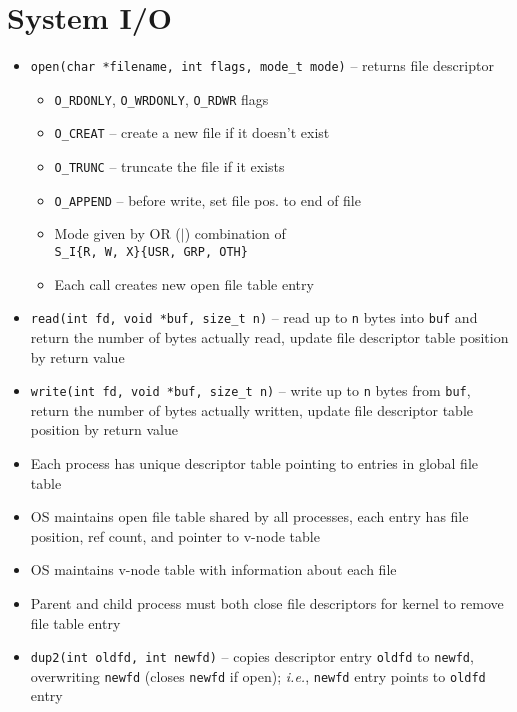 \documentclass[twocolumn]{article}
\begin{document}
\section{System I/O}
\begin{itemize}[noitemsep]
    \item \texttt{open(char *filename, int flags, mode\_t mode)} -- returns file descriptor
    \begin{itemize}[noitemsep]
        \item \texttt{O\_RDONLY}, \texttt{O\_WRDONLY}, \texttt{O\_RDWR} flags
        \item \texttt{O\_CREAT} -- create a new file if it doesn't exist
        \item \texttt{O\_TRUNC} -- truncate the file if it exists
        \item \texttt{O\_APPEND} -- before write, set file pos. to end of file
        \item Mode given by OR ($|$) combination of \\ \texttt{S\_I\{R, W, X\}\{USR, GRP, OTH\}}
        \item Each call creates new open file table entry
    \end{itemize}
    \item \texttt{read(int fd, void *buf, size\_t n)} -- read up to \texttt{n} bytes into \texttt{buf} and return the number of bytes actually read, update file descriptor table position by return value
    \item \texttt{write(int fd, void *buf, size\_t n)} -- write up to \texttt{n} bytes from \texttt{buf}, return the number of bytes actually written, update file descriptor table position by return value
    \item Each process has unique descriptor table pointing to entries in global file table
    \item OS maintains open file table shared by all processes, each entry has file position, ref count, and pointer to v-node table
    \item OS maintains v-node table with information about each file
    \item Parent and child process must both close file descriptors for kernel to remove file table entry
    \item \texttt{dup2(int oldfd, int newfd)} -- copies descriptor entry \texttt{oldfd} to \texttt{newfd}, overwriting \texttt{newfd} (closes \texttt{newfd} if open); \textit{i.e.}, \texttt{newfd} entry points to \texttt{oldfd} entry
\end{itemize}
\end{document}
